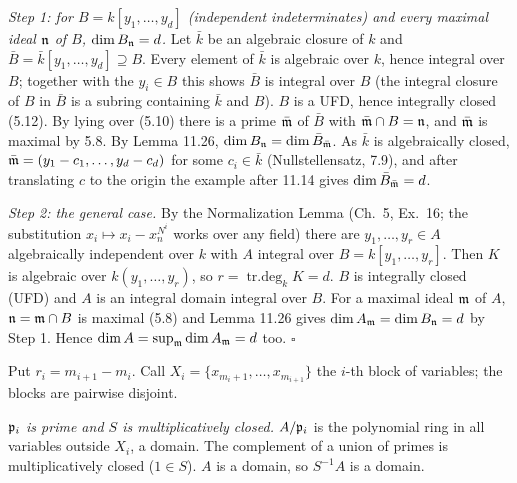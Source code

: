 \documentclass[11pt]{article}
\begin{document}
\emph{Step 1: for $B=k[y_1,\dots,y_d]$ (independent indeterminates) and every maximal ideal $\mathfrak n$ of $B$, $\dim B_\mathfrak n=d$.} Let $\bar k$ be an algebraic closure of $k$ and $\bar B=\bar k[y_1,\dots,y_d]\supseteq B$. Every element of $\bar k$ is algebraic over $k$, hence integral over $B$; together with the $y_i\in B$ this shows $\bar B$ is integral over $B$ (the integral closure of $B$ in $\bar B$ is a subring containing $\bar k$ and $B$). $B$ is a UFD, hence integrally closed (5.12). By lying over (5.10) there is a prime $\bar{\mathfrak m}$ of $\bar B$ with $\bar{\mathfrak m}\cap B=\mathfrak n$, and $\bar{\mathfrak m}$ is maximal by 5.8. By Lemma 11.26, $\dim B_\mathfrak n=\dim\bar B_{\bar{\mathfrak m}}$. As $\bar k$ is algebraically closed, $\bar{\mathfrak m}=(y_1-c_1,\dots,y_d-c_d)$ for some $c_i\in\bar k$ (Nullstellensatz, 7.9), and after translating $c$ to the origin the example after 11.14 gives $\dim\bar B_{\bar{\mathfrak m}}=d$.

\emph{Step 2: the general case.} By the Normalization Lemma (Ch.~5, Ex.~16; the substitution $x_i\mapsto x_i-x_n^{N^i}$ works over any field) there are $y_1,\dots,y_r\in A$ algebraically independent over $k$ with $A$ integral over $B=k[y_1,\dots,y_r]$. Then $K$ is algebraic over $k(y_1,\dots,y_r)$, so $r=\operatorname{tr.deg}_kK=d$. $B$ is integrally closed (UFD) and $A$ is an integral domain integral over $B$. For a maximal ideal $\mathfrak m$ of $A$, $\mathfrak n=\mathfrak m\cap B$ is maximal (5.8) and Lemma 11.26 gives $\dim A_\mathfrak m=\dim B_\mathfrak n=d$ by Step 1. Hence $\dim A=\sup_\mathfrak m\dim A_\mathfrak m=d$ too. \hfill$\square$

\pf
Put $r_i=m_{i+1}-m_i$. Call $X_i=\{x_{m_i+1},\dots,x_{m_{i+1}}\}$ the $i$-th block of variables; the blocks are pairwise disjoint.

\emph{$\mathfrak p_i$ is prime and $S$ is multiplicatively closed.} $A/\mathfrak p_i$ is the polynomial ring in all variables outside $X_i$, a domain. The complement of a union of primes is multiplicatively closed ($1\in S$). $A$ is a domain, so $S^{-1}A$ is a domain.
\end{document}
